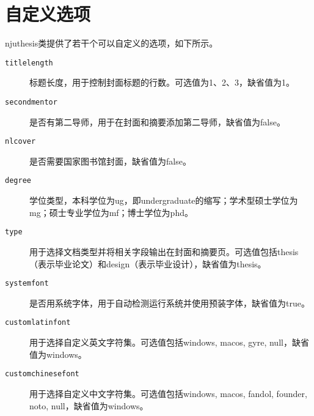 \section{自定义选项}
\label{sec:classoptions}

njuthesis类提供了若干个可以自定义的选项，如下所示。
\begin{description}
    \item[\texttt{titlelength}] 标题长度，用于控制封面标题的行数。可选值为1、2、3，缺省值为1。
    \item[\texttt{secondmentor}] 是否有第二导师，用于在封面和摘要添加第二导师，缺省值为false。
    \item[\texttt{nlcover}] 是否需要国家图书馆封面，缺省值为false。
    \item[\texttt{degree}] 学位类型，本科学位为ug，即undergraduate的缩写；学术型硕士学位为mg；硕士专业学位为mf；博士学位为phd。
    \item[\texttt{type}] 用于选择文档类型并将相关字段输出在封面和摘要页。可选值包括thesis（表示毕业论文）和design（表示毕业设计），缺省值为thesis。
    \item[\texttt{systemfont}] 是否用系统字体，用于自动检测运行系统并使用预装字体，缺省值为true。
    \item[\texttt{customlatinfont}] 用于选择自定义英文字符集。可选值包括windows, macos, gyre, null，缺省值为windows。
    \item[\texttt{customchinesefont}] 用于选择自定义中文字符集。可选值包括windows, macos, fandol, founder, noto, null，缺省值为windows。
\end{description}

